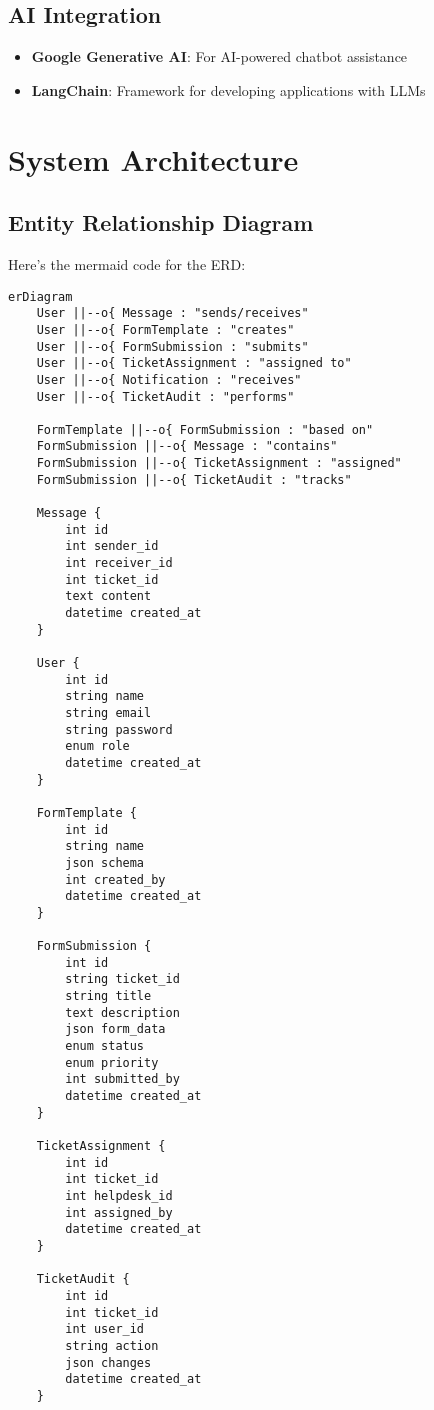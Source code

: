 \documentclass[12pt,a4paper]{article}
\begin{document}
\subsection{AI Integration}
\begin{itemize}
    \item \textbf{Google Generative AI}: For AI-powered chatbot assistance
    \item \textbf{LangChain}: Framework for developing applications with LLMs
\end{itemize}

\section{System Architecture}

\subsection{Entity Relationship Diagram}


Here's the mermaid code for the ERD:

\begin{verbatim}
erDiagram
    User ||--o{ Message : "sends/receives"
    User ||--o{ FormTemplate : "creates"
    User ||--o{ FormSubmission : "submits"
    User ||--o{ TicketAssignment : "assigned to"
    User ||--o{ Notification : "receives"
    User ||--o{ TicketAudit : "performs"
    
    FormTemplate ||--o{ FormSubmission : "based on"
    FormSubmission ||--o{ Message : "contains"
    FormSubmission ||--o{ TicketAssignment : "assigned"
    FormSubmission ||--o{ TicketAudit : "tracks"
    
    Message {
        int id
        int sender_id
        int receiver_id
        int ticket_id
        text content
        datetime created_at
    }
    
    User {
        int id
        string name
        string email
        string password
        enum role
        datetime created_at
    }
    
    FormTemplate {
        int id
        string name
        json schema
        int created_by
        datetime created_at
    }
    
    FormSubmission {
        int id
        string ticket_id
        string title
        text description
        json form_data
        enum status
        enum priority
        int submitted_by
        datetime created_at
    }
    
    TicketAssignment {
        int id
        int ticket_id
        int helpdesk_id
        int assigned_by
        datetime created_at
    }
    
    TicketAudit {
        int id
        int ticket_id
        int user_id
        string action
        json changes
        datetime created_at
    }
\end{verbatim}
\end{document}
